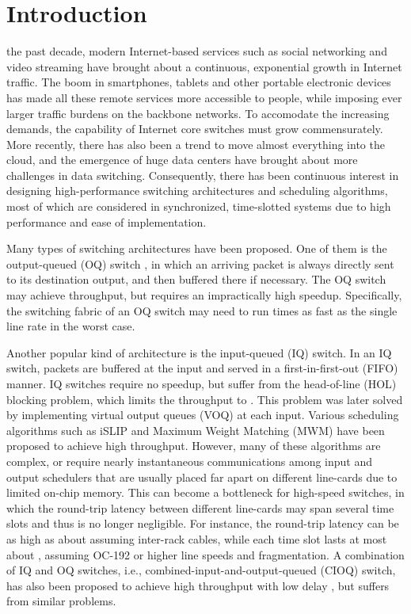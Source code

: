 \documentclass[journal,final,doublecolumn,10pt,twoside]{IEEEtranTCOM} \normalsize
\begin{document}
\IEEEpeerreviewmaketitle

\section{Introduction}
\label{sec:intro}

 the past decade, modern Internet-based services such as social networking and video streaming have brought about a continuous, exponential growth in Internet traffic. The boom in smartphones, tablets and other portable electronic devices has made all these remote services more accessible to people, while imposing ever larger traffic burdens on the backbone networks. To accomodate the increasing demands, the capability of Internet core switches must grow commensurately. More recently, there has also been a trend to move almost everything into the cloud, and the emergence of huge data centers have brought about more challenges in data switching. Consequently, there has been continuous interest in designing high-performance switching architectures and scheduling algorithms, most of which are considered in synchronized, time-slotted systems due to high performance and ease of implementation.

Many types of switching architectures have been proposed. One of them is the output-queued (OQ) switch \cite{oq}, in which an arriving packet is always directly sent to its destination output, and then buffered there if necessary. The OQ switch may achieve  throughput, but requires an impractically high speedup. Specifically, the switching fabric of an  OQ switch may need to run  times as fast as the single line rate in the worst case.

Another popular kind of architecture is the input-queued (IQ) switch. In an IQ switch, packets are buffered at the input and served in a first-in-first-out (FIFO) manner. IQ switches require no speedup, but suffer from the head-of-line (HOL) blocking problem, which limits the throughput to  \cite{oq}. This problem was later solved by implementing virtual output queues (VOQ) at each input. Various scheduling algorithms such as iSLIP \cite{islip} and Maximum Weight Matching (MWM) \cite{mwm01} have been proposed to achieve high throughput. However, many of these algorithms are complex, or require nearly instantaneous communications among input and output schedulers that are usually placed far apart on different line-cards due to limited on-chip memory. This can become a bottleneck for high-speed switches, in which the round-trip latency between different line-cards may span several time slots and thus is no longer negligible. For instance, the round-trip latency can be as high as about  assuming  inter-rack cables, while each time slot lasts at most about , assuming OC-192 or higher line speeds and  fragmentation. A combination of IQ and OQ switches, i.e., combined-input-and-output-queued (CIOQ) switch, has also been proposed to achieve high throughput with low delay \cite{cioq}, but suffers from similar problems.
\end{document}
